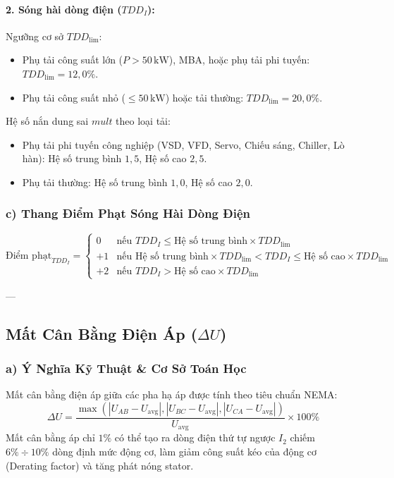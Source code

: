 \documentclass[12pt,a4paper]{article}
\begin{document}
\paragraph{2. Sóng hài dòng điện ($TDD_I$):}
Ngưỡng cơ sở $TDD_{\mathrm{lim}}$:
\begin{itemize}
  \item Phụ tải công suất lớn ($P > 50\,\mathrm{kW}$), MBA, hoặc phụ tải phi tuyến: $TDD_{\mathrm{lim}} = 12{,}0\%$.
  \item Phụ tải công suất nhỏ ($\le 50\,\mathrm{kW}$) hoặc tải thường: $TDD_{\mathrm{lim}} = 20{,}0\%$.
\end{itemize}

Hệ số nắn dung sai $mult$ theo loại tải:
\begin{itemize}
  \item Phụ tải phi tuyến công nghiệp (VSD, VFD, Servo, Chiếu sáng, Chiller, Lò hàn): Hệ số trung bình $1{,}5$, Hệ số cao $2{,}5$.
  \item Phụ tải thường: Hệ số trung bình $1{,}0$, Hệ số cao $2{,}0$.
\end{itemize}

\subsubsection{c) Thang Điểm Phạt Sóng Hài Dòng Điện}
\begin{equation}
  \text{Điểm phạt}_{TDD_I} = 
  \begin{cases} 
    0 & \text{nếu } TDD_I \le \text{Hệ số trung bình} \times TDD_{\mathrm{lim}} \\
    +1 & \text{nếu } \text{Hệ số trung bình} \times TDD_{\mathrm{lim}} < TDD_I \le \text{Hệ số cao} \times TDD_{\mathrm{lim}} \\
    +2 & \text{nếu } TDD_I > \text{Hệ số cao} \times TDD_{\mathrm{lim}}
  \end{cases}
\end{equation}

---

\subsection{\texorpdfstring{Mất Cân Bằng Điện Áp ($\Delta U$)}{Mất Cân Bằng Điện Áp (Delta U)}}

\subsubsection{a) Ý Nghĩa Kỹ Thuật \& Cơ Sở Toán Học}
Mất cân bằng điện áp giữa các pha hạ áp được tính theo tiêu chuẩn NEMA:
\begin{equation}
  \Delta U = \frac{\max\left(|U_{AB} - U_{\mathrm{avg}}|, |U_{BC} - U_{\mathrm{avg}}|, |U_{CA} - U_{\mathrm{avg}}|\right)}{U_{\mathrm{avg}}} \times 100\%
\end{equation}
Mất cân bằng áp chỉ $1\%$ có thể tạo ra dòng điện thứ tự ngược $I_2$ chiếm $6\% \div 10\%$ dòng định mức động cơ, làm giảm công suất kéo của động cơ (Derating factor) và tăng phát nóng stator.
\end{document}
